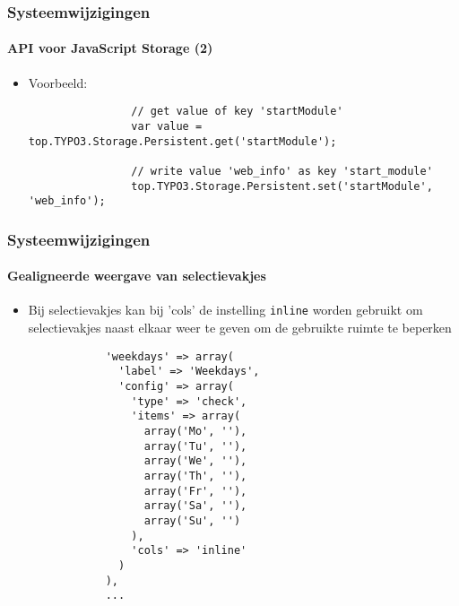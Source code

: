 \begin{frame}[fragile]
	\frametitle{Systeemwijzigingen}
	\framesubtitle{API voor JavaScript Storage  (2)}

	\begin{itemize}
		\item Voorbeeld:
			\begin{lstlisting}
				// get value of key 'startModule'
				var value = top.TYPO3.Storage.Persistent.get('startModule');

				// write value 'web_info' as key 'start_module'
				top.TYPO3.Storage.Persistent.set('startModule', 'web_info');
			\end{lstlisting}

	\end{itemize}

\end{frame}


\begin{frame}[fragile]
	\frametitle{Systeemwijzigingen}
	\framesubtitle{Gealigneerde weergave van selectievakjes}

	\lstset{basicstyle=\tiny\ttfamily}

	\begin{itemize}

		\item Bij selectievakjes kan bij 'cols' de instelling \texttt{inline} worden gebruikt 
			om selectievakjes naast elkaar weer te geven om de gebruikte ruimte te beperken

		\begin{lstlisting}
			'weekdays' => array(
			  'label' => 'Weekdays',
			  'config' => array(
			    'type' => 'check',
			    'items' => array(
			      array('Mo', ''),
			      array('Tu', ''),
			      array('We', ''),
			      array('Th', ''),
			      array('Fr', ''),
			      array('Sa', ''),
			      array('Su', '')
			    ),
			    'cols' => 'inline'
			  )
			),
			...
		\end{lstlisting}

	\end{itemize}

\end{frame}

